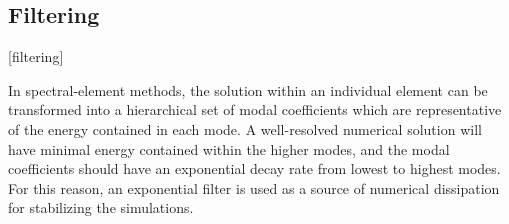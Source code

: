 \subsection{Filtering}
\label{SEC:Filtering}
\key*{}[filtering]


In spectral-element methods, the solution within an individual element
can be transformed into a hierarchical set of modal coefficients which
are representative of the energy contained in each mode.
%
A well-resolved numerical solution will have minimal energy contained
within the higher modes, and the modal coefficients should have an
exponential decay rate from lowest to highest modes.
%
For this reason, an exponential filter is used as a source of
numerical dissipation for stabilizing the simulations.


